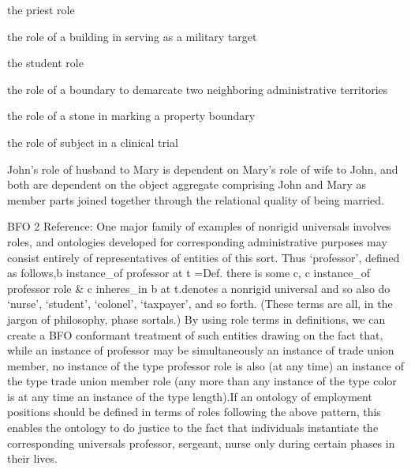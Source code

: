 \documentclass[letterpaper,10pt,english]{sphinxmanual}
\begin{document}
\begin{sphinxShadowBox}

\sphinxAtStartPar
the priest role

\sphinxAtStartPar
the role of a building in serving as a military target

\sphinxAtStartPar
the student role

\sphinxAtStartPar
the role of a boundary to demarcate two neighboring administrative territories

\sphinxAtStartPar
the role of a stone in marking a property boundary

\sphinxAtStartPar
the role of subject in a clinical trial

\sphinxAtStartPar
John’s role of husband to Mary is dependent on Mary’s role of wife to John, and both are dependent on the object aggregate comprising John and Mary as member parts joined together through the relational quality of being married.
\end{sphinxShadowBox}

\begin{sphinxShadowBox}

\sphinxAtStartPar
BFO 2 Reference: One major family of examples of non\sphinxhyphen{}rigid universals involves roles, and ontologies developed for corresponding administrative purposes may consist entirely of representatives of entities of this sort. Thus ‘professor’, defined as follows,b instance\_of professor at t =Def. there is some c, c instance\_of professor role \& c inheres\_in b at t.denotes a non\sphinxhyphen{}rigid universal and so also do ‘nurse’, ‘student’, ‘colonel’, ‘taxpayer’, and so forth. (These terms are all, in the jargon of philosophy, phase sortals.) By using role terms in definitions, we can create a BFO conformant treatment of such entities drawing on the fact that, while an instance of professor may be simultaneously an instance of trade union member, no instance of the type professor role is also (at any time) an instance of the type trade union member role (any more than any instance of the type color is at any time an instance of the type length).If an ontology of employment positions should be defined in terms of roles following the above pattern, this enables the ontology to do justice to the fact that individuals instantiate the corresponding universals \textendash{}  professor, sergeant, nurse \textendash{} only during certain phases in their lives.
\end{sphinxShadowBox}
\end{document}
